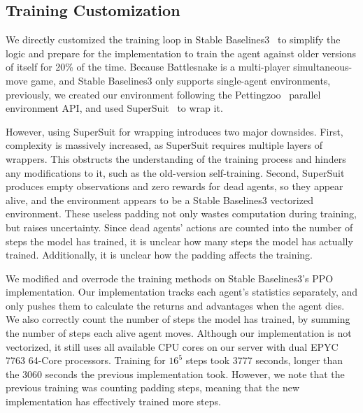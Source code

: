 \documentclass[a4paper]{article}
\begin{document}
\subsection{Training Customization}

We directly customized the training loop in Stable
Baselines3~\cite{raffin2024stable}
to simplify the logic and prepare for the implementation to train the agent
against older versions of itself for 20\% of the time.
Because Battlesnake is a multi-player simultaneous-move game,
and Stable Baselines3 only supports single-agent environments,
previously, we created our environment
following the Pettingzoo~\cite{terry2021pettingzoo} parallel environment API,
and used SuperSuit~\cite{SuperSuit} to wrap it.

However, using SuperSuit for wrapping introduces two major downsides. First,
complexity is massively increased,
as SuperSuit requires multiple layers of wrappers.
This obstructs the understanding of the training process and hinders any
modifications to it, such as the old-version self-training. Second,
SuperSuit produces empty observations and zero rewards for dead agents,
so they appear alive,
and the environment appears to be a Stable Baselines3 vectorized environment.
These useless padding not only wastes computation during training,
but raises uncertainty.
Since dead agents' actions are counted into the number of steps the model has
trained, it is unclear how many steps the model has actually trained.
Additionally, it is unclear how the padding affects the training.

We modified and overrode the training methods on Stable Baselines3's PPO
implementation. Our implementation tracks each agent's statistics separately,
and only pushes them to calculate the returns and advantages when the agent
dies. We also correctly count the number of steps the model has trained,
by summing the number of steps each alive agent moves.
Although our implementation is not vectorized,
it still uses all available CPU cores on our server with dual EPYC 7763 64-Core
processors. Training for $16^5$ steps took 3777 seconds,
longer than the 3060 seconds the previous implementation took. However,
we note that the previous training was counting padding steps,
meaning that the new implementation has effectively trained more steps.

\printbibliography
\end{document}

